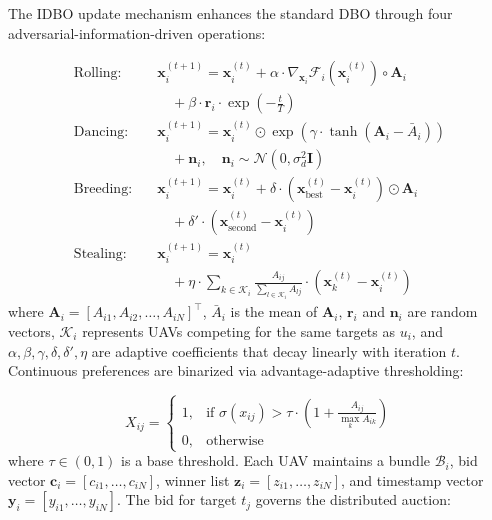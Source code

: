 \documentclass[lettersize,journal]{IEEEtran}
\begin{document}
The IDBO update mechanism enhances the standard DBO through four adversarial-information-driven operations:

\begin{align}
\text{Rolling:} \quad & \mathbf{x}_i^{(t+1)} = \mathbf{x}_i^{(t)} + \alpha \cdot \nabla_{\mathbf{x}_i} \mathcal{F}_i(\mathbf{x}_i^{(t)}) \circ \mathbf{A}_i \nonumber \\
& \quad + \beta \cdot \mathbf{r}_i \cdot \exp\left(-\frac{t}{T}\right) \label{eq:rolling_update} \\
\text{Dancing:} \quad & \mathbf{x}_i^{(t+1)} = \mathbf{x}_i^{(t)} \odot \exp\left(\gamma \cdot \tanh(\mathbf{A}_i - \bar{A}_i)\right) \nonumber \\
& \quad + \mathbf{n}_i, \quad \mathbf{n}_i \sim \mathcal{N}(0, \sigma_d^2 \mathbf{I}) \label{eq:dancing_update} \\
\text{Breeding:} \quad & \mathbf{x}_i^{(t+1)} = \mathbf{x}_i^{(t)} + \delta \cdot \left(\mathbf{x}_{\text{best}}^{(t)} - \mathbf{x}_i^{(t)}\right) \odot \mathbf{A}_i \nonumber \\
& \quad + \delta' \cdot \left(\mathbf{x}_{\text{second}}^{(t)} - \mathbf{x}_i^{(t)}\right) \label{eq:breeding_update} \\
\text{Stealing:} \quad & \mathbf{x}_i^{(t+1)} = \mathbf{x}_i^{(t)} \nonumber \\
& \quad + \eta \cdot \sum_{k \in \mathcal{K}_i} \frac{A_{ij}}{\sum_{l \in \mathcal{K}_i} A_{lj}} \cdot \left(\mathbf{x}_k^{(t)} - \mathbf{x}_i^{(t)}\right) \label{eq:stealing_update}
\end{align}
where $\mathbf{A}_i = [A_{i1}, A_{i2}, \dots, A_{iN}]^\top$, $\bar{A}_i$ is the mean of $\mathbf{A}_i$, $\mathbf{r}_i$ and $\mathbf{n}_i$ are random vectors, $\mathcal{K}_i$ represents UAVs competing for the same targets as $u_i$, and $\alpha, \beta, \gamma, \delta, \delta', \eta$ are adaptive coefficients that decay linearly with iteration $t$. Continuous preferences are binarized via advantage-adaptive thresholding:

\begin{equation}
\label{eq:thresholding}
X_{ij} = 
\begin{cases}
1, & \text{if } \sigma(x_{ij}) > \tau \cdot \left(1 + \frac{A_{ij}}{\max_k A_{ik}}\right) \\
0, & \text{otherwise}
\end{cases}
\end{equation}
where $\tau \in (0,1)$ is a base threshold. Each UAV maintains a bundle $\mathcal{B}_i$, bid vector $\mathbf{c}_i = [c_{i1}, \dots, c_{iN}]$, winner list $\mathbf{z}_i = [z_{i1}, \dots, z_{iN}]$, and timestamp vector $\mathbf{y}_i = [y_{i1}, \dots, y_{iN}]$. The bid for target $t_j$ governs the distributed auction:
\end{document}
